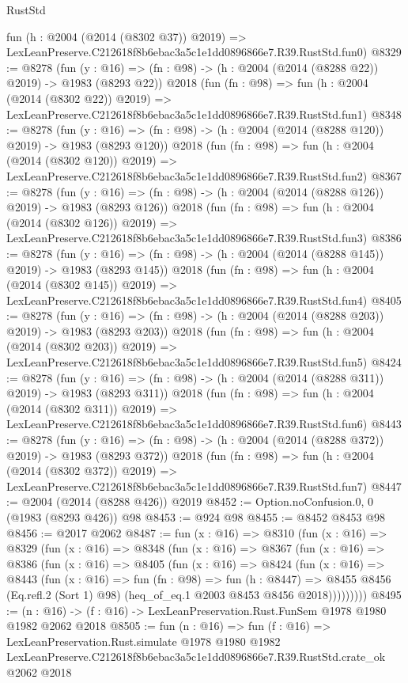 \begin{lexlean}{RustStd}
\begin{coremodule}
    fun (h : @2004 (@2014 (@8302 @37)) @2019) =>
    LexLeanPreserve.C212618f8b6ebac3a5c1e1dd0896866e7.R39.RustStd.fun0)
@8329 := @8278
    (fun (y : @16) => (fn : @98) -> (h : @2004 (@2014 (@8288 @22)) @2019) -> @1983 (@8293 @22))
    @2018
    (fun (fn : @98) =>
    fun (h : @2004 (@2014 (@8302 @22)) @2019) =>
    LexLeanPreserve.C212618f8b6ebac3a5c1e1dd0896866e7.R39.RustStd.fun1)
@8348 := @8278
    (fun (y : @16) => (fn : @98) -> (h : @2004 (@2014 (@8288 @120)) @2019) -> @1983 (@8293 @120))
    @2018
    (fun (fn : @98) =>
    fun (h : @2004 (@2014 (@8302 @120)) @2019) =>
    LexLeanPreserve.C212618f8b6ebac3a5c1e1dd0896866e7.R39.RustStd.fun2)
@8367 := @8278
    (fun (y : @16) => (fn : @98) -> (h : @2004 (@2014 (@8288 @126)) @2019) -> @1983 (@8293 @126))
    @2018
    (fun (fn : @98) =>
    fun (h : @2004 (@2014 (@8302 @126)) @2019) =>
    LexLeanPreserve.C212618f8b6ebac3a5c1e1dd0896866e7.R39.RustStd.fun3)
@8386 := @8278
    (fun (y : @16) => (fn : @98) -> (h : @2004 (@2014 (@8288 @145)) @2019) -> @1983 (@8293 @145))
    @2018
    (fun (fn : @98) =>
    fun (h : @2004 (@2014 (@8302 @145)) @2019) =>
    LexLeanPreserve.C212618f8b6ebac3a5c1e1dd0896866e7.R39.RustStd.fun4)
@8405 := @8278
    (fun (y : @16) => (fn : @98) -> (h : @2004 (@2014 (@8288 @203)) @2019) -> @1983 (@8293 @203))
    @2018
    (fun (fn : @98) =>
    fun (h : @2004 (@2014 (@8302 @203)) @2019) =>
    LexLeanPreserve.C212618f8b6ebac3a5c1e1dd0896866e7.R39.RustStd.fun5)
@8424 := @8278
    (fun (y : @16) => (fn : @98) -> (h : @2004 (@2014 (@8288 @311)) @2019) -> @1983 (@8293 @311))
    @2018
    (fun (fn : @98) =>
    fun (h : @2004 (@2014 (@8302 @311)) @2019) =>
    LexLeanPreserve.C212618f8b6ebac3a5c1e1dd0896866e7.R39.RustStd.fun6)
@8443 := @8278
    (fun (y : @16) => (fn : @98) -> (h : @2004 (@2014 (@8288 @372)) @2019) -> @1983 (@8293 @372))
    @2018
    (fun (fn : @98) =>
    fun (h : @2004 (@2014 (@8302 @372)) @2019) =>
    LexLeanPreserve.C212618f8b6ebac3a5c1e1dd0896866e7.R39.RustStd.fun7)
@8447 := @2004 (@2014 (@8288 @426)) @2019
@8452 := Option.noConfusion.{0, 0} (@1983 (@8293 @426)) @98
@8453 := @924 @98
@8455 := @8452 @8453 @98
@8456 := @2017 @2062
@8487 := fun (x : @16) =>
  @8310
    (fun (x : @16) =>
    @8329
      (fun (x : @16) =>
      @8348
        (fun (x : @16) =>
        @8367
          (fun (x : @16) =>
          @8386
            (fun (x : @16) =>
            @8405
              (fun (x : @16) =>
              @8424
                (fun (x : @16) =>
                @8443
                  (fun (x : @16) =>
                  fun (fn : @98) =>
                  fun (h : @8447) =>
                  @8455
                    @8456
                    (Eq.refl.{2} (Sort 1) @98)
                    (heq_of_eq.{1} @2003 @8453 @8456 @2018)))))))))
@8495 := (n : @16) -> (f : @16) -> LexLeanPreservation.Rust.FunSem @1978 @1980 @1982 @2062 @2018
@8505 := fun (n : @16) =>
  fun (f : @16) =>
  LexLeanPreservation.Rust.simulate
    @1978
    @1980
    @1982
    LexLeanPreserve.C212618f8b6ebac3a5c1e1dd0896866e7.R39.RustStd.crate_ok
    @2062
    @2018
\end{coremodule}
\end{lexlean}
